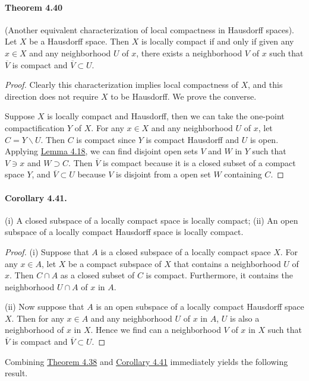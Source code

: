 \documentclass{article}
\numberwithin{equation}{section}
\theoremstyle{plain}
\theoremstyle{definition}
\begin{document}
\paragraph{Theorem 4.40\label{thm:4.40}} (Another equivalent characterization of local compactness in Hausdorff spaces). Let $X$ be a Hausdorff space. Then $X$ is locally compact if and only if given any $x\in X$ and any neighborhood $U$ of $x$, there exists a neighborhood $V$ of $x$ such that $\overline{V}$ is compact and $\overline{V}\subset U$.
\begin{proof}
Clearly this characterization implies local compactness of $X$, and this direction does not require $X$ to be Hausdorff. We prove the converse.

Suppose $X$ is locally compact and Hausdorff, then we can take the one-point compactification $Y$ of $X$. For any $x\in X$ and any neighborhood $U$ of $x$, let $C=Y\backslash U$. Then $C$ is compact since $Y$ is compact Hausdorff and $U$ is open. Applying \hyperref[lemma:4.18]{Lemma 4.18}, we can find disjoint open sets $V$ and $W$ in $Y$ such that $V\ni x$ and $W\supset C$. Then $\overline{V}$ is compact because it is a closed subset of a compact space $Y$, and $\overline{V}\subset U$ because $V$ is disjoint from a open set $W$ containing $C$.
\end{proof}

\paragraph{Corollary 4.41.\label{cor:4.41}} (i) A closed subspace of a locally compact space is locally compact; (ii) An open subspace of a locally compact Hausdorff space is locally compact. 
\begin{proof}
(i) Suppose that $A$ is a closed subspace of a locally compact space $X$. For any $x\in A$, let $X$ be a compact subspace of $X$ that contains a neighborhood $U$ of $x$. Then $C\cap A$ as a closed subset of $C$ is compact. Furthermore, it contains the neighborhood $U\cap A$ of $x$ in $A$.

(ii) Now suppose that $A$ is an open subspace of a locally compact Hausdorff space $X$. Then for any $x\in A$ and any neighborhood $U$ of $x$ in $A$, $U$ is also a neighborhood of $x$ in $X$. Hence we find can a neighborhood $V$ of $x$ in $X$ such that $\overline{V}$ is compact and $\overline{V}\subset U$.
\end{proof}

Combining \hyperref[thm:4.40]{Theorem 4.38} and \hyperref[cor:4.41]{Corollary 4.41} immediately yields the following result.
\end{document}
